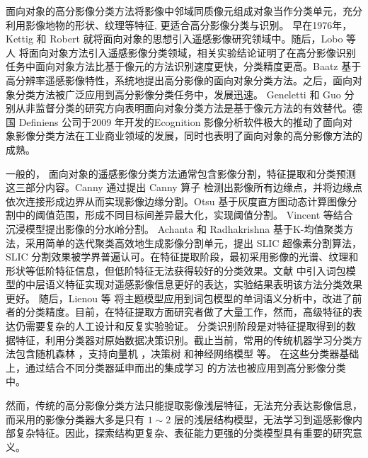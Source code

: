 面向对象的高分影像分类方法将影像中邻域同质像元组成对象当作分类单元，充分利用影像地物的形状、纹理等特征, 更适合高分影像分类与识别\cite{zhangyongsheng2004}。 早在1976年，Kettig 和 Robert \cite{kettig1976classification} 就将面向对象的思想引入遥感影像研究领域中。随后，Lobo 等人 \cite{lobo1996classification} 将面向对象方法引入遥感影像分类领域，相关实验结论证明了在高分影像识别任务中面向对象方法比基于像元的方法识别速度更快，分类精度更高。Baatz \cite{baatz1999object} 基于高分辨率遥感影像特性，系统地提出高分影像的面向对象分类方法。之后，面向对象分类方法被广泛应用到高分影像分类任务中，发展迅速。 Geneletti \cite{geneletti2003method} 和 Guo \cite{guo2007object} 分别从非监督分类的研究方向表明面向对象分类方法是基于像元方法的有效替代。德国 Definiens 公司于2009 年开发的Ecognition 影像分析软件极大的推动了面向对象影像分类方法在工业商业领域的发展，同时也表明了面向对象的高分影像方法的成熟。

一般的， 面向对象的遥感影像分类方法通常包含影像分割，特征提取和分类预测这三部分内容。Canny 通过提出 Canny 算子 \cite{canny1987computational} 检测出影像所有边缘点，并将边缘点依次连接形成边界从而实现影像边缘分割。Otsu 基于灰度直方图动态计算图像分割中的阈值范围，形成不同目标间差异最大化，实现阈值分割\cite{otsu1979threshold}。 Vincent \cite{vincent1991watersheds} 等结合沉浸模型提出影像的分水岭分割。 Achanta 和 Radhakrishna \cite{achanta2012slic} 基于K-均值聚类方法，采用简单的迭代聚类高效地生成影像分割单元，提出 SLIC 超像素分割算法，SLIC 分割效果被学界普遍认可。在特征提取阶段，最初采用影像的光谱、纹理和形状等低阶特征信息，但低阶特征无法获得较好的分类效果。文献 \cite{weizman2009urban} 中引入词包模型的中层语义特征实现对遥感影像信息更好的表达，实验结果表明该方法分类效果更好。 随后，Lienou 等\cite{lienou2010semantic} 将主题模型应用到词包模型的单词语义分析中，改进了前者的分类精度。目前，在特征提取方面研究者做了大量工作，然而，高级特征的表达仍需要复杂的人工设计和反复实验验证。 分类识别阶段是对特征提取得到的数据特征，利用分类器对原始数据决策识别。截止当前，常用的传统机器学习分类方法包含随机森林 \cite{pal2005random}，支持向量机 \cite{suykens1999least} ，决策树 \cite{friedl1997decision} 和神经网络模型 \cite{haykin1994neural} 等。 在这些分类器基础上，通过结合不同分类器延申而出的集成学习 \cite{freund1996experiments} 的方法也被应用到高分影像分类中。

然而，传统的高分影像分类方法只能提取影像浅层特征，无法充分表达影像信息，而采用的影像分类器大多是只有 $1\sim2$ 层的浅层结构模型，无法学习到遥感影像内部复杂特征。因此，探索结构更复杂、表征能力更强的分类模型具有重要的研究意义。


